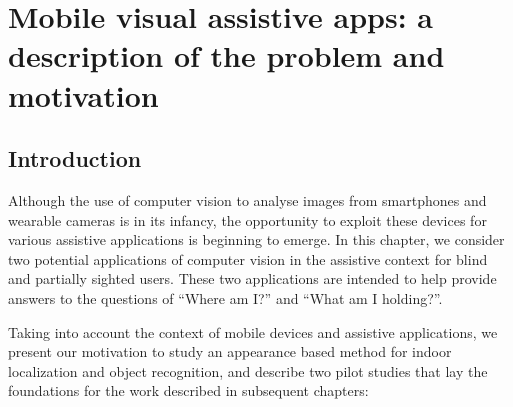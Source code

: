 \chapter{Mobile visual assistive apps: a description of the problem and motivation}\label{ch:chapter2}


%
%
%
%

\section{Introduction}

Although the use of computer vision to analyse images from smartphones and wearable cameras is in its infancy, the opportunity to exploit these devices for various assistive applications is beginning to emerge. In this chapter, we consider two potential applications of computer vision in the assistive context for blind and partially sighted users. These two applications are intended to help provide answers to the questions of ``Where am I?'' and ``What am I holding?''.

Taking into account the context of mobile devices and assistive applications, we present our motivation to study an appearance based method for indoor localization and object recognition, and describe two pilot studies that lay the foundations for the work described in subsequent chapters:

